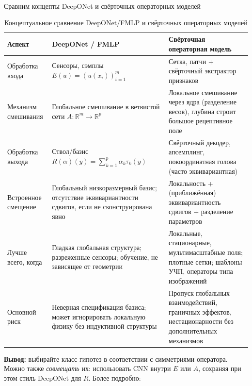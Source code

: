 \documentclass[../NDCNNAI_main.tex]{subfiles}
\begin{document}
Сравним концепты DeepONet и свёрточных операторных моделей
\begin{table}[h]
\centering
\begin{tabular}{|p{}|p{}|p{}|}
\hline
\textbf{Аспект} & \textbf{DeepONet / FMLP} & \textbf{Свёрточная операторная модель} \\
\hline
Обработка входа & Сенсоры, сэмплы $E(u) = (u(x_i))_{i=1}^m$ & Сетка, патчи + свёрточный экстрактор признаков \\
\hline
Механизм смешивания & Глобальное смешивание в ветвистой сети $A\colon \mathbb{R}^m \to \mathbb{R}^p$ & Локальное смешивание через ядра (разделение весов), глубина строит большое рецептивное поле \\
\hline
Обработка выхода & Ствол/базис $R(\alpha)(y) = \sum_{k=1}^p \alpha_k \tau_k(y)$ & Свёрточный декодер, апсемплинг, покоординатная голова (часто эквивариантная) \\
\hline
Встроенное смещение & Глобальный низкоразмерный базис; отсутствие эквивариантности сдвигов, если не сконструирована явно & Локальность + (приближённая) эквивариантность сдвигов + разделение параметров \\
\hline
Лучше всего, когда & Гладкая глобальная структура; разреженные сенсоры; обучение, не зависящее от геометрии & Локальные, стационарные, мультимасштабные поля; плотные сетки; шаблоны УЧП, операторы типа изображений \\
\hline
Основной риск & Неверная спецификация базиса; может игнорировать локальную физику без индуктивной структуры & Пропуск глобальных взаимодействий, граничных эффектов, нестационарности без дополнительных механизмов \\
\hline
\end{tabular}
\caption{Концептуальное сравнение DeepONet/FMLP и свёрточных операторных моделей}
\label{tab:deeponet_vs_conv}
\end{table}
\textbf{Вывод:} выбирайте класс гипотез в соответствии с симметриями оператора. Можно также \emph{совмещать} их: использовать CNN внутри $E$ или $A$, сохраняя при этом стиль DeepONet для $R$.
Более подробно:
\end{document}
